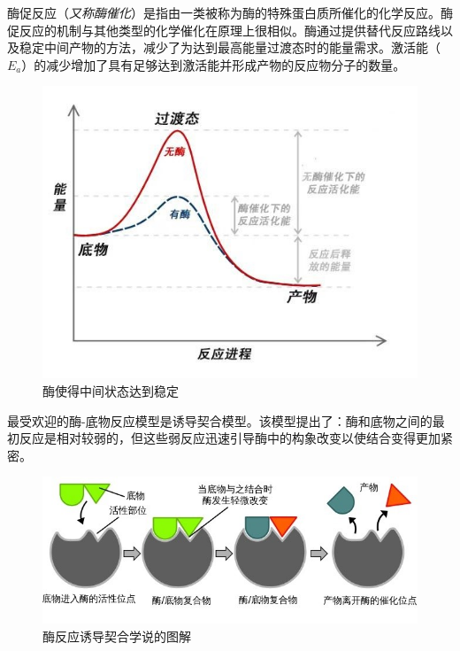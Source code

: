 \begin{multicols}{3}
酶促反应（\textit{又称酶催化}）是指由一类被称为酶的特殊蛋白质所催化的化学反应。酶促反应的机制与其他类型的化学催化在原理上很相似。酶通过提供替代反应路线以及稳定中间产物的方法，减少了为达到最高能量过渡态时的能量需求。激活能（$E_a$）的减少增加了具有足够达到激活能并形成产物的反应物分子的数量。


\begin{figure}[H]
    \centering
    \includegraphics[width=\linewidth]{IMG/201912/23.jpg}
    \caption{\kaishu 酶使得中间状态达到稳定}
    \label{fig:my_label}
\end{figure}


最受欢迎的酶-底物反应模型是诱导契合模型。该模型提出了：酶和底物之间的最初反应是相对较弱的，但这些弱反应迅速引导酶中的构象改变以使结合变得更加紧密。

\begin{figure}[H]
    \centering
    \includegraphics[width=\linewidth]{IMG/201912/123.jpg}
    \caption{\kaishu 酶反应诱导契合学说的图解}
    \label{fig:my_label}
\end{figure}



\end{multicols}
